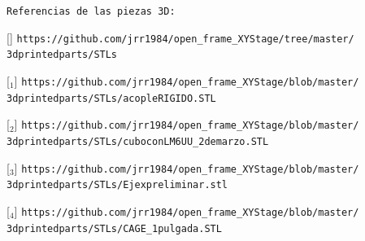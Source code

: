 \texttt{Referencias de las piezas 3D:}

[\href{https://github.com/jrr1984/open\_frame\_XYStage/tree/master/3dprintedparts/STLs}{\faCubes}] \texttt{https://github.com/jrr1984/open\_frame\_XYStage/tree/master/\\\hspace{1.5cm}3dprintedparts/STLs}

[\href{https://github.com/jrr1984/open\_frame\_XYStage/blob/master/3dprintedparts/STLs/acopleRIGIDO.STL}{\faCubes$_{1}$}] \texttt{https://github.com/jrr1984/open\_frame\_XYStage/blob/master/\\\hspace{1.5cm}3dprintedparts/STLs/acopleRIGIDO.STL}

[\href{https://github.com/jrr1984/open\_frame\_XYStage/blob/master/3dprintedparts/STLs/cuboconLM6UU\_2demarzo.STL}{\faCubes$_{2}$}] \texttt{https://github.com/jrr1984/open\_frame\_XYStage/blob/master/\\\hspace{1.5cm}3dprintedparts/STLs/cuboconLM6UU\_2demarzo.STL}

[\href{https://github.com/jrr1984/open\_frame\_XYStage/blob/master/3dprintedparts/STLs/Ejexpreliminar.stl}{\faCubes$_{3}$}] \texttt{https://github.com/jrr1984/open\_frame\_XYStage/blob/master/\\\hspace{1.5cm}3dprintedparts/STLs/Ejexpreliminar.stl}

[\href{https://github.com/jrr1984/open\_frame\_XYStage/blob/master/3dprintedparts/STLs/CAGE\_1pulgada.STL}{\faCubes$_{4}$}] \texttt{https://github.com/jrr1984/open\_frame\_XYStage/blob/master/\\\hspace{1.5cm}3dprintedparts/STLs/CAGE\_1pulgada.STL}